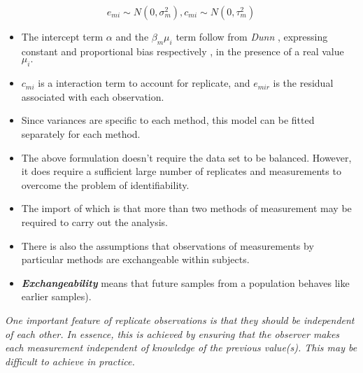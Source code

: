 \documentclass{report}
\begin{document}
{

	\[ e_{mi} \sim N(0,\sigma^{2}_{m}), c_{mi} \sim N(0,\tau^{2}_{m})\]
}

\begin{itemize}
	\item The intercept term $\alpha$ and the $\beta_{m}\mu_{i}$ term follow
	from \textit{Dunn} \cite{DunnSEME}, expressing constant and proportional bias
	respectively , in the presence of a real value $\mu_{i}.$
	\item $c_{mi}$ is a interaction term to account for replicate, and
	$e_{mir}$ is the residual associated with each observation.
	\item Since variances are specific to each method, this model can be
	fitted separately for each method.
\end{itemize}


%
\begin{itemize}
	\item The above formulation doesn't require the data set to be balanced.
	However, it does require a sufficient large number of replicates
	and measurements to overcome the problem of identifiability. 
	\item The
	import of which is that more than two methods of measurement may
	be required to carry out the analysis. 
\end{itemize}


%
\begin{itemize}
	\item There is also the
	assumptions that observations of measurements by particular
	methods are exchangeable within subjects. \item \textbf{\textit{Exchangeability}} means
	that future samples from a population behaves like earlier
	samples).
\end{itemize}


%
\emph{
	One important feature of replicate observations is that they should be independent
	of each other. In essence, this is achieved by ensuring that the observer makes each
	measurement independent of knowledge of the previous value(s). This may be difficult
	to achieve in practice.}
\end{document}
